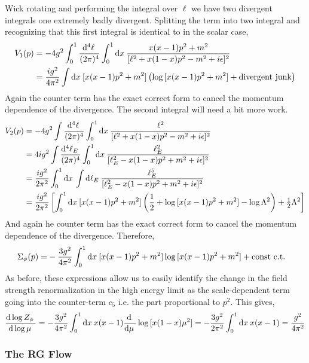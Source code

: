 \documentclass[12pt]{article}
\begin{document}
Wick rotating and performing the integral over $\ell$ we have two divergent integrals one extremely badly divergent. Splitting the term into two integral and recognizing that this first integral is identical to in the scalar case,
\begin{align*}
V_1(p) & = - 4g^2 \int_0^1 \frac{\mathrm{d}^{4} \ell \:}{(2 \pi)^4} \int_0^1 \mathrm{d}x \: \frac{x(x - 1) p^2 + m^2}{[\ell^2 + x(1 - x) p^2 - m^2 + i \epsilon]^2}
\\
& = \frac{ig^2}{4 \pi^2} \int \mathrm{d}x \: [x(x - 1) p^2 + m^2]\left(  \log{[x(x - 1) p^2 + m^2]} + \text{divergent junk} \right)
\end{align*}
Again the counter term has the exact correct form to cancel the momentum dependence of the divergence. The second integral will need a bit more work.
\begin{align*}
V_2(p) & = - 4g^2 \int \frac{\mathrm{d}^{4} \ell \:}{(2 \pi)^4} \int_0^1 \mathrm{d}x \: \frac{\ell^2}{[\ell^2 + x(1 - x) p^2 - m^2 + i \epsilon]^2}
\\
& = 4i g^2 \int \frac{\mathrm{d}^{4} \ell_E \:}{(2 \pi)^4} \int_0^1 \mathrm{d}x \: \frac{\ell_E^2}{[\ell_E^2 - x(1 - x) p^2 + m^2 + i \epsilon]^2}
\\
& = \frac{ig^2}{2 \pi^2}  \int_0^1 \mathrm{d}x \: \int \mathrm{d}\ell_E \: \frac{\ell_E^5}{[\ell_E^2 - x(1 - x) p^2 + m^2 + i \epsilon]^2}
\\
& = \frac{ig^2}{2 \pi^2} \left[ \int_0^1 \mathrm{d}x \: [x(x - 1)p^2 + m^2] \left( \frac{1}{2} + \log{[x(x - 1)p^2 + m^2]} - \log{\Lambda^2} \right) + \tfrac{1}{2} \Lambda^2 \right]
\end{align*}
And again he counter term has the exact correct form to cancel the momentum dependence of the divergence.
Therefore,
\begin{align*}
\Sigma_\phi(p) = & - \frac{3g^2}{4 \pi^2} \int_0^1 \mathrm{d}x \: [x(x - 1)p^2 + m^2] \log{[x(x - 1)p^2 + m^2]} + \text{const c.t.}
\end{align*}
As before, these expressions allow us to easily identify the change in the field strength renormalization in the high energy limit as the scale-dependent term going into the counter-term $c_5$ i.e. the part proportional to $p^2$. This gives,
\[ \frac{\mathrm{d}\log{Z_{\phi}} \:}{\mathrm{d}\log{\mu} \:} = - \frac{3g^2}{4 \pi^2} \int_0^1 \mathrm{d}x \: x(x - 1) \frac{\mathrm{d} \:}{\mathrm{d}\mu \:} \log{[x(1 - x)\mu^2]} = - \frac{3g^2}{2 \pi^2} \int_0^1 \mathrm{d}x \: x(x - 1) = \frac{g^2}{4 \pi^2} \]

\subsubsection{The RG Flow}
\end{document}

